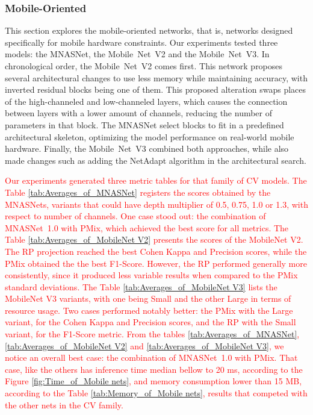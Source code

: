 




\FloatBarrier

\subsubsection{Mobile-Oriented}

This section explores the mobile-oriented networks, that is, networks designed specifically for mobile hardware constraints. Our experiments tested three models: the MNASNet, the \mbox{Mobile Net V2} and the \mbox{Mobile Net V3}. In chronological order, the \mbox{Mobile Net V2} comes first. This network proposes several architectural changes to use less memory while maintaining accuracy, with inverted residual blocks being one of them. This proposed alteration swaps places of the high-channeled and low-channeled layers, which causes the connection between layers with a lower amount of channels, reducing the number of parameters in that block. The MNASNet select blocks to fit in a predefined architectural skeleton, optimizing the model performance on real-world mobile hardware. Finally, the \mbox{Mobile Net V3} combined both approaches, while also made changes such as adding the NetAdapt \cite{NetAdapt} algorithm in the architectural search.

\textcolor{red}{
Our experiments generated three metric tables for that family of \gls{CV} models.
The Table \ref{tab:Averages_of_MNASNet} registers the scores obtained by the MNASNets, variants that could have depth multiplier of 0.5, 0.75, 1.0 or 1.3, with respect to number of channels. One case stood out: the combination of \mbox{MNASNet 1.0} with \gls{PMix}, which achieved the best score for all metrics.
The Table \ref{tab:Averages_of_MobileNet V2} presents the scores of the MobileNet V2. The \gls{RP} projection reached the best Cohen Kappa and Precision scores, while the \gls{PMix} obtained the the best F1-Score. However, the \gls{RP} performed generally more consistently, since it produced less variable results when compared to the \gls{PMix} standard deviations. 
The Table \ref{tab:Averages_of_MobileNet V3} lists the MobileNet V3 variants, with one being Small and the other Large in terms of resource usage. Two cases performed notably better: the \gls{PMix} with the Large variant, for the Cohen Kappa and Precision scores, and the \gls{RP} with the Small variant, for the F1-Score metric.
From the tables \ref{tab:Averages_of_MNASNet}, \ref{tab:Averages_of_MobileNet V2} and \ref{tab:Averages_of_MobileNet V3}, we notice an overall best case: the combination of \mbox{MNASNet 1.0} with \gls{PMix}. That case, like the others has inference time median bellow to 20 ms, according to the Figure \ref{fig:Time_of_Mobile nets}, and memory consumption lower than 15 MB, according to the Table \ref{tab:Memory_of_Mobile nets}, results that competed with the other nets in the \gls{CV} family.
}

